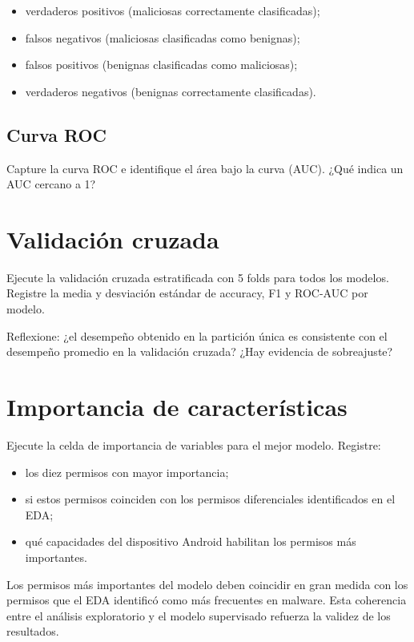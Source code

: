 \documentclass[
  coursetitle={Cómputo Nube y Tecnologías Emergentes},
  coursehours={96},
  coursedate={Verano 2026},
  doctype={Taller},
  otherlangs={english,french},
  authorname={Lázaro},
  authorsurname={Bustio-Martínez},
  authortitle={PhD},
  role={Profesor Investigador},
  email={lbustio@inaoe.mx},
  phone={5559504000},
  ext={7459},
  institution={Instituto Nacional de Astrofísica, Óptica y Electrónica (INAOE)},
  department={Maestría en Ciencias en Tecnologías de Seguridad},
  address={Luis Enrique Erro 1, Sta. Ma. Tonantzintla, San Andrés Cholula, CP 72840, Puebla, México},
  margin={0.5in}
]{../../lbustio_lecture_notes}
\begin{document}
\begin{itemize}
    \item verdaderos positivos (maliciosas correctamente clasificadas);
    \item falsos negativos (maliciosas clasificadas como benignas);
    \item falsos positivos (benignas clasificadas como maliciosas);
    \item verdaderos negativos (benignas correctamente clasificadas).
\end{itemize}

\subsection{Curva ROC}

Capture la curva ROC e identifique el área bajo la curva (AUC). ¿Qué indica un AUC cercano a 1?

\section{Validación cruzada}

Ejecute la validación cruzada estratificada con 5 folds para todos los modelos. Registre la media y desviación estándar de accuracy, F1 y ROC-AUC por modelo.

Reflexione: ¿el desempeño obtenido en la partición única es consistente con el desempeño promedio en la validación cruzada? ¿Hay evidencia de sobreajuste?

\section{Importancia de características}

Ejecute la celda de importancia de variables para el mejor modelo. Registre:

\begin{itemize}
    \item los diez permisos con mayor importancia;
    \item si estos permisos coinciden con los permisos diferenciales identificados en el EDA;
    \item qué capacidades del dispositivo Android habilitan los permisos más importantes.
\end{itemize}

\begin{tcolorbox}[title=Punto de control 2]
Los permisos más importantes del modelo deben coincidir en gran medida con los permisos que el EDA identificó como más frecuentes en malware. Esta coherencia entre el análisis exploratorio y el modelo supervisado refuerza la validez de los resultados.
\end{tcolorbox}
\end{document}
